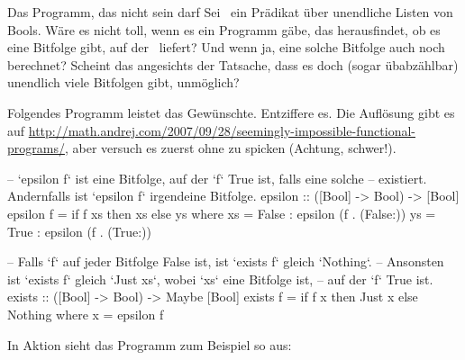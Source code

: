 \documentclass{uebblatt}
\begin{document}
\begin{aufgabe}{Das Programm, das nicht sein darf}
Sei~ ein Prädikat über unendliche Listen
von Bools. Wäre es nicht toll, wenn es ein Programm gäbe, das herausfindet,
ob es eine Bitfolge gibt, auf der~ 
liefert? Und wenn ja, eine solche Bitfolge auch noch berechnet? Scheint das
angesichts der Tatsache, dass es doch (sogar übabzählbar) unendlich viele
Bitfolgen gibt, unmöglich?

Folgendes Programm leistet das Gewünschte. Entziffere es. Die Auflösung gibt es
auf
\url{http://math.andrej.com/2007/09/28/seemingly-impossible-functional-programs/},
aber versuch es zuerst ohne zu spicken (Achtung, schwer!).

\begin{haskellcode}
-- `epsilon f` ist eine Bitfolge, auf der `f` True ist, falls eine solche
-- existiert. Andernfalls ist `epsilon f` irgendeine Bitfolge.
epsilon :: ([Bool] -> Bool) -> [Bool]
epsilon f = if f xs then xs else ys
    where
    xs = False : epsilon (f . (False:))
    ys = True  : epsilon (f . (True:))

-- Falls `f` auf jeder Bitfolge False ist, ist `exists f` gleich `Nothing`.
-- Ansonsten ist `exists f` gleich `Just xs`, wobei `xs` eine Bitfolge ist,
-- auf der `f` True ist.
exists :: ([Bool] -> Bool) -> Maybe [Bool]
exists f = if f x then Just x else Nothing
    where x = epsilon f
\end{haskellcode}

In Aktion sieht das Programm zum Beispiel so aus:
\end{aufgabe}
\end{document}
